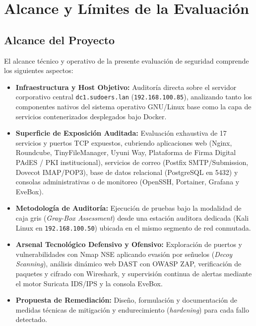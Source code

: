 \section{Alcance y Límites de la Evaluación}

\subsection{Alcance del Proyecto}

El alcance técnico y operativo de la presente evaluación de seguridad comprende los siguientes aspectos:

\begin{itemize}
  \item \textbf{Infraestructura y Host Objetivo:} Auditoría directa sobre el servidor corporativo central \texttt{dc1.sudoers.lan} (\texttt{192.168.100.85}), analizando tanto los componentes nativos del sistema operativo GNU/Linux base como la capa de servicios contenerizados desplegados bajo Docker.
  \item \textbf{Superficie de Exposición Auditada:} Evaluación exhaustiva de 17 servicios y puertos TCP expuestos, cubriendo aplicaciones web (Nginx, Roundcube, TinyFileManager, Uyuni Way, Plataforma de Firma Digital PAdES / PKI institucional), servicios de correo (Postfix SMTP/Submission, Dovecot IMAP/POP3), base de datos relacional (PostgreSQL en 5432) y consolas administrativas o de monitoreo (OpenSSH, Portainer, Grafana y EveBox).
  \item \textbf{Metodología de Auditoría:} Ejecución de pruebas bajo la modalidad de caja gris (\textit{Gray-Box Assessment}) desde una estación auditora dedicada (Kali Linux en \texttt{192.168.100.50}) ubicada en el mismo segmento de red conmutada.
  \item \textbf{Arsenal Tecnológico Defensivo y Ofensivo:} Exploración de puertos y vulnerabilidades con Nmap NSE aplicando evasión por señuelos (\textit{Decoy Scanning}), análisis dinámico web DAST con OWASP ZAP, verificación de paquetes y cifrado con Wireshark, y supervisión continua de alertas mediante el motor Suricata IDS/IPS y la consola EveBox.
  \item \textbf{Propuesta de Remediación:} Diseño, formulación y documentación de medidas técnicas de mitigación y endurecimiento (\textit{hardening}) para cada fallo detectado.
\end{itemize}


